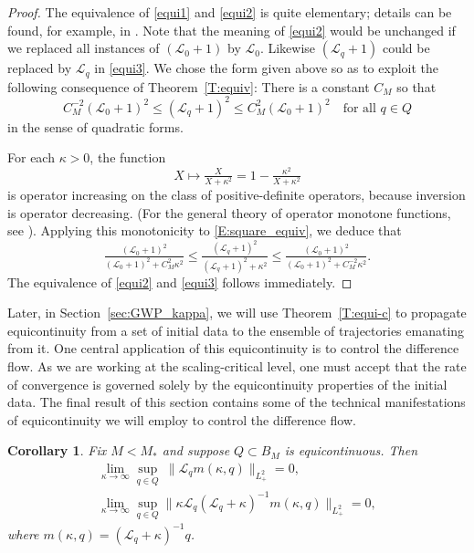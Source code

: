 \documentclass{amsart}
\numberwithin{equation}{section}
\newtheorem{corollary}[theorem]{Corollary}
\theoremstyle{definition}
\newcommand{\ka}{\kappa}
\newcommand{\Lc}{\mathcal{L}}
\begin{document}
\begin{proof}
The equivalence of \eqref{equi1} and \eqref{equi2} is quite elementary; details can be found, for example, in \cite[\S4]{killip2019kdv}.
Note that the meaning of \eqref{equi2} would be unchanged if we replaced all instances of $(\Lc_0+1)$ by $\Lc_0$.  Likewise $(\Lc_q+1)$ could be replaced by $\Lc_q$ in \eqref{equi3}.  We chose the form given above so as to exploit the following consequence of Theorem~\ref{T:equiv}: There is a constant $C_M$ so that
\begin{equation}\label{E:square_equiv}
C_M^{-2} (\Lc_0+1)^2 \leq (\Lc_q+1)^2 \leq C_M^2 (\Lc_0+1)^2 \quad\text{for all $q\in Q$}
\end{equation}
in the sense of quadratic forms.

For each $\kappa>0$, the function
\begin{equation*}
X \mapsto \tfrac{X}{X+\kappa^2} = 1 - \tfrac{\kappa^2}{X+\kappa^2}
\end{equation*}
is operator increasing on the class of positive-definite operators, because inversion is operator decreasing.  (For the general theory of operator monotone functions, see \cite{Simon:Loewner}).  Applying this monotonicity to \eqref{E:square_equiv}, we deduce that 
\begin{equation}\label{E:square_equiv'}
\tfrac{(\Lc_0+1)^2}{(\Lc_0+1)^2 + C_M^{2} \kappa^2} \leq \tfrac{(\Lc_q+1)^2}{(\Lc_q+1)^2 + \kappa^2} \leq \tfrac{(\Lc_0+1)^2}{(\Lc_0+1)^2 + C_M^{-2} \kappa^2}.
\end{equation}
The equivalence of \eqref{equi2} and \eqref{equi3} follows immediately.
\end{proof}

Later, in Section~\ref{sec:GWP_kappa}, we will use Theorem~\ref{T:equi-c} to propagate equicontinuity from a set of initial data to the ensemble of trajectories emanating from it.  One central application of this equicontinuity is to control the difference flow.  As we are working at the scaling-critical level, one must accept that the rate of convergence is governed solely by the equicontinuity properties of the initial data.  The final result of this section contains some of the technical manifestations of equicontinuity we will employ to control the difference flow.

\begin{corollary}\label{C:decay}
Fix $M<M_*$ and suppose $Q \subset B_M$ is equicontinuous.  Then
\begin{align}
\lim_{\ka\to\infty} \sup_{q\in Q}\ \|\Lc_q m(\ka,q)\|_{L^2_+}=0,\label{item2}\\
\lim_{\ka\to\infty}\sup_{q\in Q}\|\ka \Lc_q (\Lc_q+\ka)^{-1}m(\ka,q)\|_{L^2_+}=0,\label{item4}
\end{align}
where $m(\kappa,q) = (\Lc_q+\ka)^{-1}q$.
\end{corollary}
\end{document}
